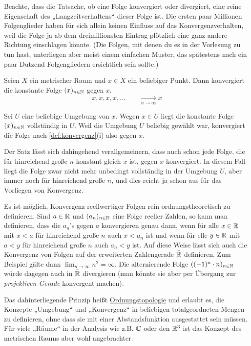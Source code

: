 \begin{bem}
    Beachte, dass die Tatsache, ob eine Folge konvergiert oder divergiert, eine reine Eigenschaft des „Langzeitverhaltens“ dieser Folge ist. Die ersten paar Millionen Folgenglieder haben für sich allein keinen Einfluss auf das Konvergenzverhalten, weil die Folge ja ab dem dreimillionsten Eintrag plötzlich eine ganz andere Richtung einschlagen könnte. (Die Folgen, mit denen du es in der Vorlesung zu tun hast, unterliegen aber meist einem einfachen Muster, das spätestens nach ein paar Dutzend Folgengliedern ersichtlich sein sollte.)
\end{bem}


\begin{bsp}
    Seien $X$ ein metrischer Raum und $x \in X$ ein beliebiger Punkt. Dann konvergiert die konstante Folge $(x)_{n\in \mathbb N}$ gegen $x$.
        \[ x,x,x,x,\dots \qquad \xrightarrow[n\to \infty]{} x \]
\end{bsp}
    
    
\begin{bew}
    Sei $U$ eine beliebige Umgebung von $x$. Wegen $x\in U$ liegt die konstante Folge $(x)_{n\in \mathbb N}$ vollständig in $U$. Weil die Umgebung $U$ beliebig gewählt war, konvergiert die Folge nach \cref{def:konvergenz}(i) also gegen $x$.
\end{bew}


\begin{bem}
    Der Satz lässt sich dahingehend verallgemeinern, dass auch schon jede Folge, die für hinreichend große $n$ konstant gleich $x$ ist, gegen $x$ konvergiert. In diesem Fall liegt die Folge zwar nicht mehr unbedingt vollständig in der Umgebung $U$, aber immer noch für hinreichend große $n$, und dies reicht ja schon aus für das Vorliegen von Konvergenz.
\end{bem}


\begin{vorschau}[* Ordnungstopologie]
    Es ist möglich, Konvergenz reellwertiger Folgen rein ordnungstheoretisch zu definieren. Sind $a\in \mathbb R$ und $(a_n)_{n\in \mathbb N}$ eine Folge reeller Zahlen, so kann man definieren, dass die $a_n$'s gegen $a$ konvergieren genau dann, wenn für alle $x\in \mathbb R$ mit $x<a$ für hinreichend große $n$ auch $x<a_n$ ist und wenn für elle $y\in \mathbb R$ mit $a<y$ für hinreichend große $n$ auch $a_n<y$ ist. Auf diese Weise lässt sich auch die Konvergenz von Folgen auf der erweiterten Zahlengerade $\bar {\mathbb R}$ definieren. Zum Beispiel gälte dann $\lim_{n\to\infty} n^2=\infty$. Die alternierende Folge $((-1)^n\cdot n)_{n\in \mathbb N}$ würde dagegen auch in $\bar{\mathbb R}$ divergieren (man könnte sie aber per Übergang zur \emph{projektiven Gerade} konvergent machen).
    
    Das dahinterliegende Prinzip heißt \href{https://de.wikipedia.org/wiki/Ordnungstopologie}{Ordnungstopologie} und erlaubt es, die Konzepte „Umgebung“ und „Konvergenz“ in beliebigen totalgeordneten Mengen zu definieren, ohne dass sie mit einer Abstandsfunktion ausgestattet sein müssen. Für viele „Räume“ in der Analysis wie z.B. $\mathbb C$ oder den $\mathbb R^3$ ist das Konzept des metrischen Raums aber wohl angebrachter.
\end{vorschau}





